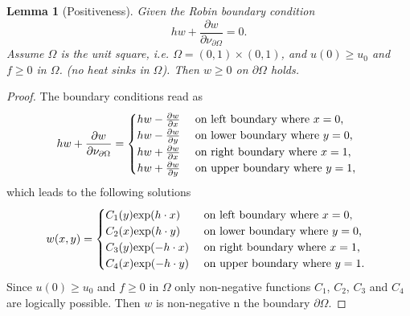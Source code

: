 \documentclass[a4paper,11pt]{article}
\theoremstyle{plain} %
\newtheorem{lemma}{Lemma}[section]
\theoremstyle{definition} %
\theoremstyle{remark} %
\theoremstyle{remark}
\def\uTemp{u}
\begin{document}
\begin{lemma}[Positiveness] \label{positiveness}
Given the Robin boundary condition
\begin{equation*}
h w + \frac{\partial w}{\partial \nu_{\partial \Omega }} = 0 .
\end{equation*}
Assume $ \Omega $ is the unit square, i.e. $ \Omega = (0,1)\times (0,1 )$, and $ \uTemp (0) \geq \uTemp_0 $ and $ f \geq 0 $ in $ \Omega $. (no heat sinks in $\Omega $).
Then $ w\geq 0 $ on $ \partial \Omega $ holds.
\end{lemma}

\begin{proof}
The boundary conditions read as
\begin{equation*}
h w + \frac{\partial w}{\partial \nu_{\partial \Omega }} = 
\begin{cases}
h w - \frac{\partial w}{\partial x} & \text{ on left boundary where $ x= 0 $, }\\
h w - \frac{\partial w}{\partial y} & \text{ on lower boundary where $ y= 0 $, }\\
h w + \frac{\partial w}{\partial x} & \text{ on right boundary where $ x= 1 $, }\\
h w + \frac{\partial w}{\partial y} & \text{ on upper boundary where $ y= 1 $, }
\end{cases}
\end{equation*}
which leads to the following solutions
\begin{equation*}
w(x ,y)  = 
\begin{cases}
C_1(y) \mathrm{exp}(h\cdot x) & \text{ on left boundary where $ x= 0 $, }\\
C_2(x) \mathrm{exp}(h\cdot y) & \text{ on lower boundary where $ y= 0 $, }\\
C_3(y) \mathrm{exp}(-h\cdot x) & \text{ on right boundary where $ x= 1 $, }\\
C_4(x) \mathrm{exp}(-h\cdot y) & \text{ on upper boundary where $ y= 1 $. }
\end{cases}
\end{equation*}
Since $ \uTemp (0) \geq \uTemp_0 $ and $ f \geq 0 $ in $ \Omega $ only non-negative functions $C_1 $, $C_2 $, $C_3 $ and $C_4 $ are logically possible. Then $w $ is non-negative n the boundary $ \partial \Omega $.
\end{proof}
\end{document}

